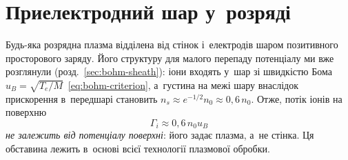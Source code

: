 \section{Приелектродний шар у~розряді}\label{sec:discharge-sheath}

Будь-яка розрядна плазма відділена від стінок і~електродів шаром позитивного
просторового заряду. Його структуру для малого перепаду потенціалу ми вже розглянули
(розд.~\ref{sec:bohm-sheath}): іони входять у~шар зі швидкістю Бома $u_B=\sqrt{T_e/M}$~\eqref{eq:bohm-criterion},
а~густина на межі шару внаслідок прискорення в~передшарі становить $n_s\approx e^{-1/2}n_0\approx0{,}6\,n_0$.
Отже, потік іонів на поверхню
\begin{equation}\label{eq:bohm-flux}
	\Gamma_i\approx0{,}6\,n_0u_B
\end{equation}
\emph{не залежить від потенціалу поверхні}: його задає плазма, а~не стінка. Ця обставина
лежить в~основі всієї технології плазмової обробки.

